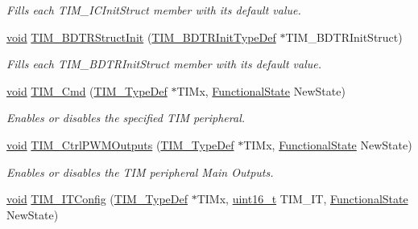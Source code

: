 \begin{DoxyCompactItemize}
\begin{DoxyCompactList}\small\item\em Fills each T\+I\+M\+\_\+\+I\+C\+Init\+Struct member with its default value. \end{DoxyCompactList}\item 
\hyperlink{usb__devapi_8h_afabf60e7f57651d6d595a02c75f07cd0}{void} \hyperlink{group___t_i_m___private___functions_gaea0f49938cda8ae0738162194798afc6}{T\+I\+M\+\_\+\+B\+D\+T\+R\+Struct\+Init} (\hyperlink{struct_t_i_m___b_d_t_r_init_type_def}{T\+I\+M\+\_\+\+B\+D\+T\+R\+Init\+Type\+Def} $\ast$T\+I\+M\+\_\+\+B\+D\+T\+R\+Init\+Struct)
\begin{DoxyCompactList}\small\item\em Fills each T\+I\+M\+\_\+\+B\+D\+T\+R\+Init\+Struct member with its default value. \end{DoxyCompactList}\item 
\hyperlink{usb__devapi_8h_afabf60e7f57651d6d595a02c75f07cd0}{void} \hyperlink{group___t_i_m___private___functions_ga2bdc275bcbd2ce9d1ba632e6c89896b7}{T\+I\+M\+\_\+\+Cmd} (\hyperlink{struct_t_i_m___type_def}{T\+I\+M\+\_\+\+Type\+Def} $\ast$T\+I\+Mx, \hyperlink{agilefox_2library_2inc_2stm32f10x__type_8h_ac9a7e9a35d2513ec15c3b537aaa4fba1}{Functional\+State} New\+State)
\begin{DoxyCompactList}\small\item\em Enables or disables the specified T\+IM peripheral. \end{DoxyCompactList}\item 
\hyperlink{usb__devapi_8h_afabf60e7f57651d6d595a02c75f07cd0}{void} \hyperlink{group___t_i_m___private___functions_ga3e59ebced2ab8e0b817c460f1670e97d}{T\+I\+M\+\_\+\+Ctrl\+P\+W\+M\+Outputs} (\hyperlink{struct_t_i_m___type_def}{T\+I\+M\+\_\+\+Type\+Def} $\ast$T\+I\+Mx, \hyperlink{agilefox_2library_2inc_2stm32f10x__type_8h_ac9a7e9a35d2513ec15c3b537aaa4fba1}{Functional\+State} New\+State)
\begin{DoxyCompactList}\small\item\em Enables or disables the T\+IM peripheral Main Outputs. \end{DoxyCompactList}\item 
\hyperlink{usb__devapi_8h_afabf60e7f57651d6d595a02c75f07cd0}{void} \hyperlink{group___t_i_m___private___functions_ga70e3d6c09d55ee69002e154c85cd40e4}{T\+I\+M\+\_\+\+I\+T\+Config} (\hyperlink{struct_t_i_m___type_def}{T\+I\+M\+\_\+\+Type\+Def} $\ast$T\+I\+Mx, \hyperlink{_p_e___types_8h_a1f1825b69244eb3ad2c7165ddc99c956}{uint16\+\_\+t} T\+I\+M\+\_\+\+IT, \hyperlink{agilefox_2library_2inc_2stm32f10x__type_8h_ac9a7e9a35d2513ec15c3b537aaa4fba1}{Functional\+State} New\+State)

\end{DoxyCompactItemize}
